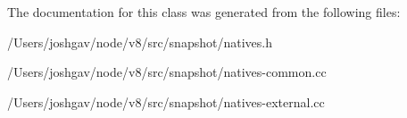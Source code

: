 The documentation for this class was generated from the following files\+:\begin{DoxyCompactItemize}
\item 
/\+Users/joshgav/node/v8/src/snapshot/natives.\+h\item 
/\+Users/joshgav/node/v8/src/snapshot/natives-\/common.\+cc\item 
/\+Users/joshgav/node/v8/src/snapshot/natives-\/external.\+cc\end{DoxyCompactItemize}
